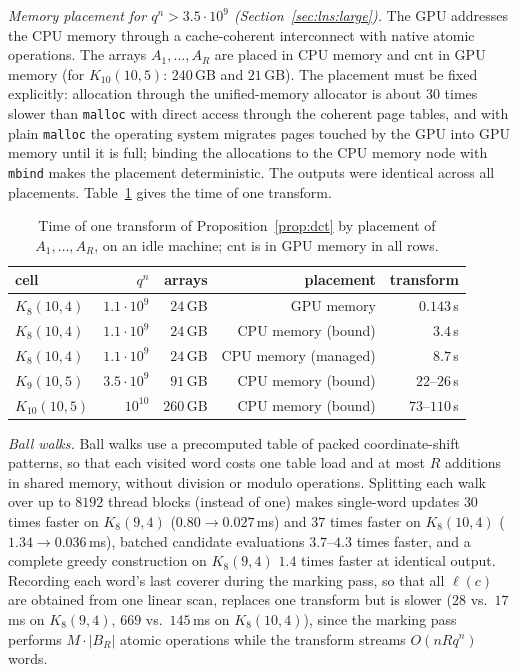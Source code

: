 \documentclass[11pt]{amsart}
\newcommand{\Kq}[3]{K_{#1}(#2,#3)}
\begin{document}
\emph{Memory placement for $q^n>3.5\cdot 10^9$
(Section~\textup{\ref{sec:lns:large}}).} The GPU addresses the CPU memory
through a cache-coherent interconnect with native atomic operations. The
arrays $A_1,\dots,A_R$ are placed in CPU memory and $\mathrm{cnt}$ in GPU
memory (for $\Kq{10}{10}{5}$: $240$\,GB and $21$\,GB). The placement must
be fixed explicitly: allocation through the unified-memory allocator is
about $30$ times slower than \texttt{malloc} with direct access through
the coherent page tables, and with plain \texttt{malloc} the operating
system migrates pages touched by the GPU into GPU memory until it is full;
binding the allocations to the CPU memory node with \texttt{mbind} makes
the placement deterministic. The outputs were identical across all
placements. Table~\ref{tab:hc} gives the time of one transform.

\begin{table}[ht]
\centering
\begin{tabular}{lrrrr}
\toprule
cell & $q^n$ & arrays & placement & transform \\
\midrule
$\Kq{8}{10}{4}$ & $1.1\cdot 10^9$ & $24$\,GB & GPU memory & $0.143$\,s \\
$\Kq{8}{10}{4}$ & $1.1\cdot 10^9$ & $24$\,GB & CPU memory (bound) & $3.4$\,s \\
$\Kq{8}{10}{4}$ & $1.1\cdot 10^9$ & $24$\,GB & CPU memory (managed) & $8.7$\,s \\
$\Kq{9}{10}{5}$ & $3.5\cdot 10^9$ & $91$\,GB & CPU memory (bound) & $22$--$26$\,s \\
$\Kq{10}{10}{5}$ & $10^{10}$ & $260$\,GB & CPU memory (bound) & $73$--$110$\,s \\
\bottomrule
\end{tabular}
\caption{Time of one transform of Proposition~\ref{prop:dct} by placement
of $A_1,\dots,A_R$, on an idle machine; $\mathrm{cnt}$ is in GPU memory in
all rows.}
\label{tab:hc}
\end{table}

\emph{Ball walks.} Ball walks use a precomputed table of packed
coordinate-shift patterns, so that each visited word costs one table load
and at most $R$ additions in shared memory, without division or modulo
operations. Splitting each walk over up to $8192$ thread blocks (instead
of one) makes single-word updates $30$ times faster on $\Kq{8}{9}{4}$
($0.80\to 0.027$\,ms) and $37$ times faster on $\Kq{8}{10}{4}$ ($1.34\to
0.036$\,ms), batched candidate evaluations $3.7$--$4.3$ times faster, and
a complete greedy construction on $\Kq{8}{9}{4}$ $1.4$ times faster at
identical output. Recording each word's last coverer during the marking
pass, so that all $\ell(c)$ are obtained from one linear scan, replaces
one transform but is slower ($28$ vs.\ $17$\,ms on $\Kq{8}{9}{4}$, $669$
vs.\ $145$\,ms on $\Kq{8}{10}{4}$), since the marking pass performs
$M\cdot|B_R|$ atomic operations while the transform streams $O(nRq^n)$
words.
\end{document}

